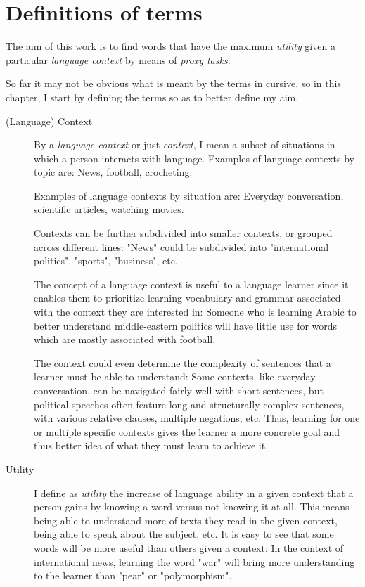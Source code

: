 
\section{Definitions of terms}
The aim of this work is to find words that have the maximum \textit{utility} given a particular \textit{language context} by means of \textit{proxy tasks}.

So far it may not be obvious what is meant by the terms in cursive, so in this chapter, I start by defining the terms so as to better define my aim.

\begin{description}
	\item[(Language) Context]
	      By a \textit{language context} or just \textit{context}, I mean a subset of situations in which a person interacts with language.
	      Examples of language contexts by topic are:
	      News, football, crocheting.

	      Examples of language contexts by situation are:
	      Everyday conversation, scientific articles, watching movies.

	      Contexts can be further subdivided into smaller contexts, or grouped across different lines:
	      "News" could be subdivided into "international politics", "sports", "business", etc.

	      The concept of a language context is useful to a language learner since it enables them to prioritize learning vocabulary and grammar associated with the context they are interested in:
	      Someone who is learning Arabic to better understand middle-eastern politics will have little use for words which are mostly associated with football.

	      The context could even determine the complexity of sentences that a learner must be able to understand:
	      Some contexts, like everyday conversation, can be navigated fairly well with short sentences, but political speeches often feature long and structurally complex sentences, with various relative clauses, multiple negations, etc.
	      Thus, learning for one or multiple specific contexts gives the learner a more concrete goal and thus better idea of what they must learn to achieve it.

	\item[Utility]
	      I define as \textit{utility} the increase of language ability in a given context that a person gains by knowing a word versus not knowing it at all.
	      This means being able to understand more of texts they read in the given context, being able to speak about the subject, etc.
	      It is easy to see that some words will be more useful than others given a context:
	      In the context of international news, learning the word "war" will bring more understanding to the learner than "pear" or "polymorphism".


\end{description}

